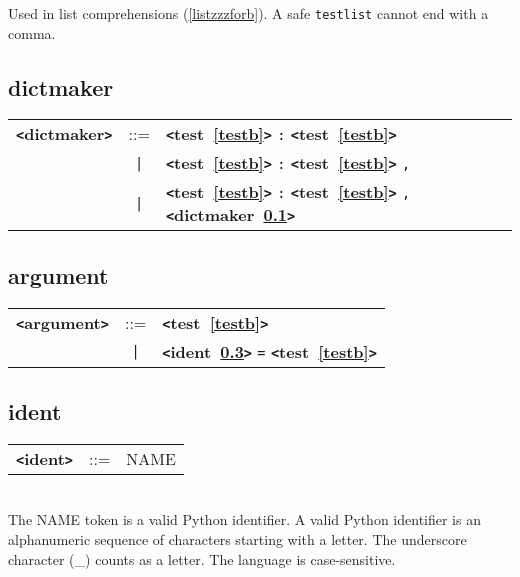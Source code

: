 \documentclass[12pt]{article}
\begin{document}
Used in list comprehensions (\ref{listzzzforb}).  A safe \verb|testlist| cannot end with a comma.

\subsection{dictmaker}
\label{dictmakerb}
\begin{tabular}{lcl}
{\bf \verb+<+dictmaker\verb+>+} & ::=  & {\bf \verb+<+test~\ref{testb}\verb+>+}  \verb|:| {\bf \verb+<+test~\ref{testb}\verb+>+}  \\
 & \verb+|+  & {\bf \verb+<+test~\ref{testb}\verb+>+}  \verb|:| {\bf \verb+<+test~\ref{testb}\verb+>+}  \verb|,| \\
 & \verb+|+  & {\bf \verb+<+test~\ref{testb}\verb+>+}  \verb|:| {\bf \verb+<+test~\ref{testb}\verb+>+}  \verb|,| {\bf \verb+<+dictmaker~\ref{dictmakerb}\verb+>+}  \\
\end{tabular}

\subsection{argument}
\label{argumentb}
\begin{tabular}{lcl}
{\bf \verb+<+argument\verb+>+} & ::=  & {\bf \verb+<+test~\ref{testb}\verb+>+}  \\
 & \verb+|+  & {\bf \verb+<+ident~\ref{identb}\verb+>+}  \verb|=| {\bf \verb+<+test~\ref{testb}\verb+>+}  \\
\end{tabular}

\subsection{ident}
\label{identb}
\begin{tabular}{lcl}
{\bf \verb+<+ident\verb+>+} & ::=  & NAME \\
\end{tabular} \\

The NAME token is a valid Python identifier.  A valid Python identifier is an alphanumeric sequence of characters starting with a letter.  The underscore character (\_) counts as a letter.  The language is case-sensitive.
\end{document}
